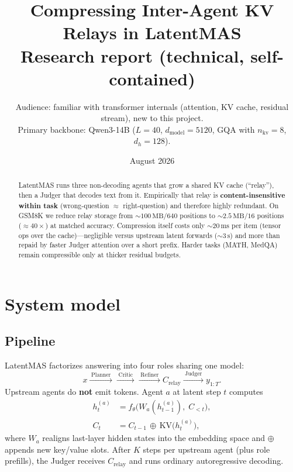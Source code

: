 \documentclass[11pt]{article}
\title{\textbf{Compressing Inter-Agent KV Relays in LatentMAS}\\[6pt]
\large Research report (technical, self-contained)}
\author{Audience: familiar with transformer internals (attention, KV cache,
residual stream), new to this project.\\[4pt]
Primary backbone: Qwen3-14B
($L{=}40$, $d_{\mathrm{model}}{=}5120$, GQA with $n_{\mathrm{kv}}{=}8$,
$d_h{=}128$).\\[2pt]
\date{August 2026}}
\begin{document}
\maketitle

\begin{abstract}
LatentMAS runs three non-decoding agents that grow a shared KV cache
(``relay''), then a Judger that decodes text from it. Empirically that relay is
\textbf{content-insensitive within task} (wrong-question $\approx$
right-question) and therefore highly redundant. On GSM8K we reduce relay
storage from $\sim\!100\,\mathrm{MB}/640$ positions to
$\sim\!2.5\,\mathrm{MB}/16$ positions ($\approx 40\times$) at matched
accuracy. Compression itself costs only $\sim\!20\,\mathrm{ms}$ per item
(tensor ops over the cache)---negligible versus upstream latent forwards
($\sim\!3\,\mathrm{s}$) and more than repaid by faster Judger attention over a
short prefix. Harder tasks (MATH, MedQA) remain compressible only at thicker
residual budgets.
\end{abstract}

\tableofcontents
\vspace{1em}

\section{System model}

\subsection{Pipeline}

LatentMAS factorizes answering into four roles sharing one model:
\[
x
  \xrightarrow{\;\mathrm{Planner}\;}
  \xrightarrow{\;\mathrm{Critic}\;}
  \xrightarrow{\;\mathrm{Refiner}\;}
  C_{\mathrm{relay}}
  \xrightarrow{\;\mathrm{Judger}\;}
  y_{1:T}.
\]
Upstream agents do \textbf{not} emit tokens. Agent $a$ at latent step $t$
computes
\begin{align*}
h_t^{(a)}
  &= f_\theta\!\bigl(W_a(h_{t-1}^{(a)}),\; C_{<t}\bigr), \\
C_t
  &= C_{t-1}\,\oplus\,\mathrm{KV}\!\bigl(h_t^{(a)}\bigr),
\end{align*}
where $W_a$ realigns last-layer hidden states into the embedding space and
$\oplus$ appends new key/value slots. After $K$ steps per upstream agent (plus
role prefills), the Judger receives $C_{\mathrm{relay}}$ and runs ordinary
autoregressive decoding.
\end{document}
